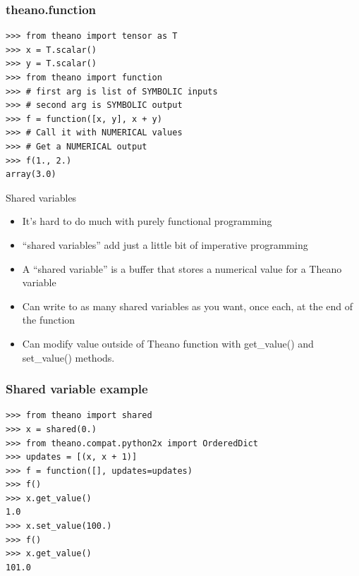\documentclass[utf8x,xcolor=pdftex,dvipsnames,table]{beamer}
\begin{document}
\begin{frame}[fragile]
  \frametitle{theano.function}

\begin{lstlisting}
>>> from theano import tensor as T
>>> x = T.scalar()
>>> y = T.scalar()
>>> from theano import function
>>> # first arg is list of SYMBOLIC inputs
>>> # second arg is SYMBOLIC output
>>> f = function([x, y], x + y)
>>> # Call it with NUMERICAL values
>>> # Get a NUMERICAL output
>>> f(1., 2.)
array(3.0)
\end{lstlisting}
\end{frame}

\begin{frame}{Shared variables}
  \begin{itemize}
  \item It’s hard to do much with purely functional programming
  \item ``shared variables'' add just a little bit of imperative programming
  \item A ``shared variable'' is a buffer that stores a numerical value for a Theano variable
  \item Can write to as many shared variables as you want, once each, at the end of the function
  \item Can modify value outside of Theano function with get\_value() and set\_value() methods.
  \end{itemize}
\end{frame}

\begin{frame}[fragile]
  \frametitle{Shared variable example}

\begin{lstlisting}
>>> from theano import shared
>>> x = shared(0.)
>>> from theano.compat.python2x import OrderedDict
>>> updates = [(x, x + 1)]
>>> f = function([], updates=updates)
>>> f()
>>> x.get_value()
1.0
>>> x.set_value(100.)
>>> f()
>>> x.get_value()
101.0
\end{lstlisting}
\end{frame}
\end{document}
